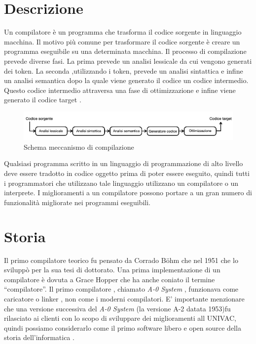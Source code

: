 \documentclass[12pt,a4paper]{report}
\begin{document}
\section{Descrizione}
Un compilatore è un programma che trasforma il codice sorgente in linguaggio macchina. Il motivo più comune per trasformare il codice sorgente è creare un programma eseguibile su una determinata macchina. Il processo di compilazione prevede diverse fasi. La prima prevede un analisi lessicale da cui vengono generati dei token. La seconda ,utilizzando i token, prevede un analisi sintattica e infine un analisi semantica dopo la quale viene generato il codice un codice intermedio. Questo codice intermedio attraversa una fase di ottimizzazione e infine viene generato il codice target \cite{GCC} \cite{LLVM}.


\begin{figure}
\centering
\includegraphics[width = \textwidth]{SchemaCompilatore.png}
\caption{Schema meccanismo di compilazione}
\label{Fig:MeccanismoCompilazione}
\end{figure}

Qualsiasi programma scritto in un linguaggio di programmazione di alto livello deve essere tradotto in codice oggetto prima di poter essere eseguito, quindi tutti i programmatori che utilizzano tale linguaggio utilizzano un compilatore o un interprete. I miglioramenti a un compilatore possono portare a un gran numero di funzionalità migliorate nei programmi eseguibili.

\section{Storia}
Il primo compilatore teorico fu pensato da Corrado Böhm che nel 1951 che lo sviluppò per la sua tesi di dottorato.  Una  prima implementazione di un compilatore è dovuta a Grace Hopper  che ha anche coniato il termine ``compilatore''.  Il primo compilatore , chiamato \textit{A-0 System} ,  funzionava come caricatore o linker , non come i moderni compilatori. E' importante menzionare che una versione successiva del \textit{A-0 System} (la versione A-2 datata 1953)fu rilasciato ai clienti con lo scopo di sviluppare dei miglioramenti all UNIVAC, quindi possiamo considerarlo come il primo software libero e open source della storia dell'informatica \cite{SystemA0,openSource1,openOrg,stallman2003software}.
\end{document}
